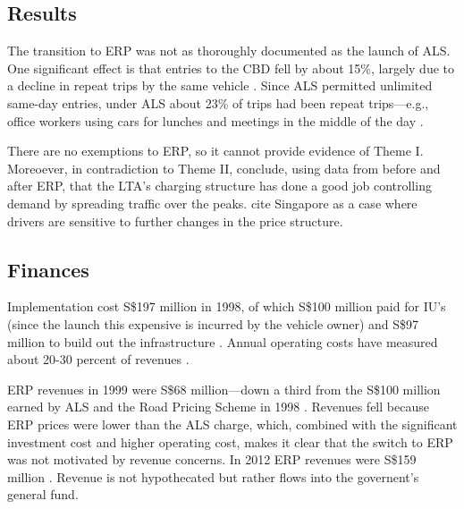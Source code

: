 \subsection{Results}

The transition to ERP was not as thoroughly documented as the launch of ALS. One significant effect is that entries to the CBD fell by about 15\%, largely due to a decline in repeat trips by the same vehicle \citep{Menon2000}. Since ALS permitted unlimited same-day entries, under ALS about 23\% of trips had been repeat trips---e.g., office workers using cars for lunches and meetings in the middle of the day \citep[p. 23]{Chin2009}. \citet{Olszewski2005} 

There are no exemptions to ERP, so it cannot provide evidence of Theme I. Moreoever, in contradiction to Theme II, \citet{Olszewski2005} conclude, using data from before and after ERP, that the LTA's charging structure has done a good job controlling demand by spreading traffic over the peaks. \citet[p. 45]{Borjesson2018} cite Singapore as a case where drivers are sensitive to further changes in the price structure.

\subsection{Finances}

Implementation cost S\$197 million in 1998, of which S\$100 million paid for IU's (since the launch this expensive is incurred by the vehicle owner) and S\$97 million to build out the infrastructure \citep{Santos2004}. Annual operating costs have measured about 20-30 percent of revenues \citep{Chin2009}.

ERP revenues in 1999 were S\$68 million---down a third from the S\$100 million earned by ALS and the Road Pricing Scheme in 1998 \cite[p. 34]{Goh2002}. Revenues fell because ERP prices were lower than the ALS charge, which, combined with the significant investment cost and higher operating cost, makes it clear that the switch to ERP was not motivated by revenue concerns. In 2012 ERP revenues were S\$159 million \citep{Chen2012}. Revenue is not hypothecated but rather flows into the governent's general fund.

